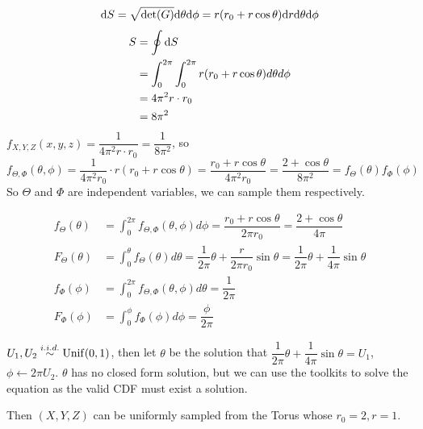 \begin{homeworkProblem}
$$\mathrm{d}S = \sqrt{\det(G)}\mathrm{d}\theta\mathrm{d}\phi = r(r_0+r\cos\theta)\mathrm{d}r\mathrm{d}\theta\mathrm{d}\phi$$
\begin{align*}
S &= \oint \mathrm{d}S \\
&= \int_{0}^{2\pi}\int_{0}^{2\pi}r(r_0+r\cos\theta)d\theta d\phi \\
&= 4\pi^2r\cdot r_0 \\
&= 8\pi^2
\end{align*}
$f_{X,Y,Z}(x,y,z)=\dfrac{1}{4\pi^2r\cdot r_0}=\dfrac{1}{8\pi^2}$, so
$$f_{\Theta, \Phi}(\theta,\phi)=\dfrac{1}{4\pi^2r_0}\cdot r(r_0+r\cos\theta)=\dfrac{r_0+r\cos\theta}{4\pi^2r_0} = \dfrac{2+\cos\theta}{8\pi^2}=f_{\Theta}(\theta)f_{\Phi}(\phi)$$
So $\Theta$ and $\Phi$ are independent variables, we can sample them respectively.

\begin{align*}
f_{\Theta}(\theta) &= \int_{0}^{2\pi}f_{\Theta, \Phi}(\theta,\phi)d\phi = \dfrac{r_0+r\cos\theta}{2\pi r_0} = \dfrac{2+\cos\theta}{4\pi} \\
F_{\Theta}(\theta) &= \int_{0}^{\theta}f_{\Theta}(\theta)d\theta = \dfrac{1}{2\pi}\theta + \dfrac{r}{2\pi r_0}\sin\theta = \dfrac{1}{2\pi}\theta + \dfrac{1}{4\pi}\sin\theta \\
f_{\Phi}(\phi) &= \int_{0}^{2\pi}f_{\Theta, \Phi}(\theta,\phi)d\theta = \dfrac{1}{2\pi} \\
F_{\Phi}(\phi) &= \int_{0}^{\phi}f_{\Phi}(\phi)d\phi = \dfrac{\phi}{2\pi}
\end{align*}

$U_1, U_2\stackrel{i.i.d.}{\sim} \operatorname{Unif}(0, 1)$, then let
$\theta$ be the solution that $\dfrac{1}{2\pi}\theta + \dfrac{1}{4\pi}\sin\theta=U_1$, $\phi\leftarrow 2\pi U_2$. $\theta$ has no closed form solution, but we can use the toolkits to solve the equation as the valid CDF must exist a solution.

Then $(X, Y, Z)$ can be uniformly sampled from the Torus whose $r_0=2,r=1$.


\end{homeworkProblem}
